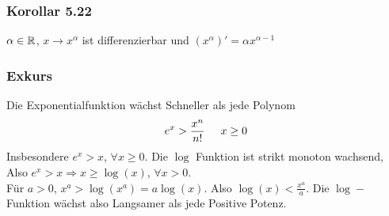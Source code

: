 \subsubsection*{Korollar 5.22}
$\alpha\in\mathbb{R}$, $x\to x^\alpha$ ist differenzierbar und $\left( x^\alpha\right)'=\alpha x^{\alpha-1}$

\subsubsection*{Exkurs}
Die Exponentialfunktion wächst Schneller als jede Polynom
\[{e^x} > \frac{{{x^n}}}{{n!}}\hspace{5mm}x \ge 0\]
Insbesondere $e^x>x$, $\forall x\geq 0$. Die $\log$ Funktion ist strikt monoton wachsend, Also $e^x>x\Rightarrow x\geq \log(x)$, $\forall x>0$.\\

Für $a>0$, $x^a>\log (x^a)=a\log(x)$. Also $\log(x)<\frac{x^a}{a}$. Die $\log-$Funktion wächst also Langsamer als jede Positive Potenz.

